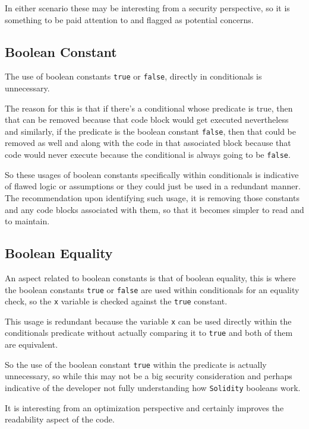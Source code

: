 In either scenario these may be interesting from a security perspective,
so it is something to be paid attention to and flagged as potential
concerns.

\subsection{Boolean Constant}\label{boolean-constant}

The use of boolean constants \texttt{true} or \texttt{false}, directly
in conditionals is unnecessary.

The reason for this is that if there's a conditional whose predicate is
true, then that can be removed because that code block would get
executed nevertheless and similarly, if the predicate is the boolean
constant \texttt{false}, then that could be removed as well and along
with the code in that associated block because that code would never
execute because the conditional is always going to be \texttt{false}.

So these usages of boolean constants specifically within conditionals is
indicative of flawed logic or assumptions or they could just be used in
a redundant manner. The recommendation upon identifying such usage, it
is removing those constants and any code blocks associated with them, so
that it becomes simpler to read and to maintain.

\subsection{Boolean Equality}\label{boolean-equality}

An aspect related to boolean constants is that of boolean equality, this
is where the boolean constants \texttt{true} or \texttt{false} are used
within conditionals for an equality check, so the \texttt{x} variable is
checked against the \texttt{true} constant.

This usage is redundant because the variable \texttt{x} can be used
directly within the conditionals predicate without actually comparing it
to \texttt{true} and both of them are equivalent.

So the use of the boolean constant \texttt{true} within the predicate is
actually unnecessary, so while this may not be a big security
consideration and perhaps indicative of the developer not fully
understanding how \texttt{Solidity} booleans work.

It is interesting from an optimization perspective and certainly
improves the readability aspect of the code.
